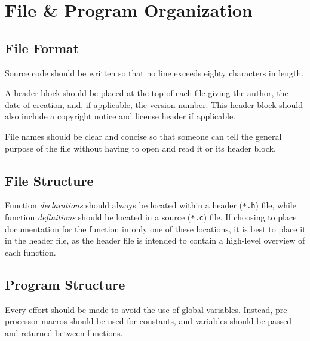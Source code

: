 \documentclass[StyleGuide.tex]{subfiles}
\begin{document}
\chapter{File \& Program Organization}\label{ch:file-program-organization}

\section{File Format}\label{sec:file-format}

Source code should be written so that no line exceeds eighty characters
in length.

A header block should be placed at the top of each file giving the
author, the date of creation, and, if applicable, the version number.
This header block should also include a copyright notice and license
header if applicable.

File names should be clear and concise so that someone can tell the
general purpose of the file without having to open and read it or its
header block.

\section{File Structure}\label{file-structure}

Function \emph{declarations} should always be located within a header
(\texttt{*.h}) file, while function \emph{definitions} should be located
in a source (\texttt{*.c}) file. If choosing to place documentation for
the function in only one of these locations, it is best to place it in
the header file, as the header file is intended to contain a high-level
overview of each function.

\section{Program Structure}\label{program-structure}

Every effort should be made to avoid the use of global variables.
Instead, pre-processor macros should be used for constants, and
variables should be passed and returned between functions.
\end{document}
